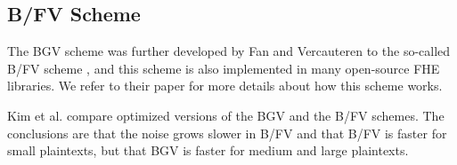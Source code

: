 \subsection{B/FV Scheme}\label{sec:bfv}

The BGV scheme was further developed by Fan and Vercauteren to the so-called B/FV scheme \cite{cite:bfv}, and this scheme is also implemented in many open-source FHE libraries. We refer to their paper for more details about how this scheme works.



Kim et al. \cite{cite:bgv_vs_bfv} compare optimized versions of the BGV and the B/FV schemes. The conclusions are that the noise grows slower in B/FV and that B/FV is faster for small plaintexts, but that BGV is faster for medium and large plaintexts.